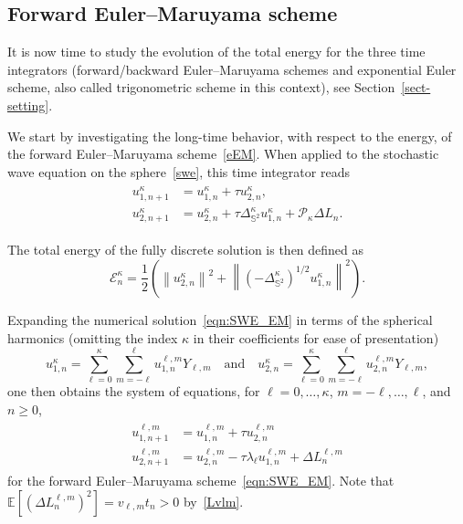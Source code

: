 \documentclass[11pt]{amsart}
\newcommand{\E}{{\mathbb E}}
\newcommand{\IS}{\mathbb{S}}
\providecommand{\norm}[1]{\left\lVert#1\right\rVert}
\newcommand{\Deltalb}{\Delta_{\IS^2}}
\newcommand{\cP}{\mathcal{P}}
\begin{document}
\subsection{Forward Euler--Maruyama scheme}
It is now time to study the evolution of the total energy for the three time integrators (forward/backward Euler--Maruyama schemes and exponential Euler scheme,
also called trigonometric scheme in this context), see Section~\ref{sect-setting}.

We start by investigating the long-time behavior, with respect to the energy, of the forward Euler--Maruyama scheme~\eqref{eEM}. When applied to the stochastic wave equation on the sphere~\eqref{swe}, this time integrator reads 
\begin{align}
    \begin{split}
\label{eqn:SWE_EM}
u_{1,n+1}^\kappa&=u_{1,n}^\kappa+\tau u_{2,n}^\kappa,\\
u_{2,n+1}^\kappa&=u_{2,n}^\kappa+\tau \Deltalb^\kappa u_{1,n}^\kappa+\cP_\kappa\Delta L_n.
    \end{split}
\end{align}


The total energy of the fully discrete solution is then defined as
\begin{equation}\label{swe-full-energy}
\mathcal{E}^\kappa_n=\frac{1}{2}\left(\norm{u_{2,n}^\kappa}^2+\norm{(-\Delta_{\IS^2}^\kappa)^{1/2}u_{1,n}^\kappa}^2\right).
\end{equation}

Expanding the numerical solution~\eqref{eqn:SWE_EM} in terms of the spherical harmonics (omitting the index $\kappa$ in their coefficients for ease of presentation)
\begin{equation*}
u_{1,n}^\kappa = \sum_{\ell = 0}^{\kappa} \sum_{m=-\ell}^{\ell} u_{1,n}^{\ell, m} Y_{\ell, m}\quad\text{and}\quad
u_{2,n}^\kappa = \sum_{\ell = 0}^{\kappa} \sum_{m=-\ell}^{\ell} u_{2,n}^{\ell, m} Y_{\ell, m},
\end{equation*}
one then obtains the system of equations, for $\ell=0,\ldots,\kappa$, $m=-\ell,\ldots,\ell$, and $n\geq 0$,
\begin{align}
    \begin{split}
    \label{eqn:SWE_EM2}
    u_{1,n+1}^{\ell, m} &= u_{1, n}^{\ell, m} + \tau u_{2, n}^{\ell, m}\\
    u_{2,n+1}^{\ell, m} &= u_{2, n}^{\ell, m} - \tau  \lambda_\ell u_{1, n}^{\ell, m} + \Delta L^{\ell, m}_n
    \end{split}
\end{align}
for the forward Euler--Maruyama scheme~\eqref{eqn:SWE_EM}. Note that $\E\left[(\Delta L^{\ell, m}_n)^2\right]=v_{\ell,m}t_n>0$ by~\eqref{Lvlm}.
\end{document}

